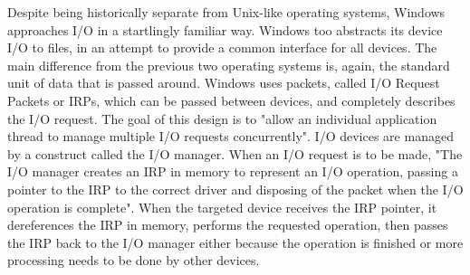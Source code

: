 \documentclass[10pt,draftclsnofoot,onecolumn]{IEEEtran}
\begin{document}
    \par
    Despite being historically separate from Unix-like operating systems, Windows approaches I/O in a startlingly familiar way. Windows too abstracts its device I/O to files, in an attempt to provide a common interface for all devices. The main difference from the previous two operating systems is, again, the standard unit of data that is passed around. Windows uses packets, called I/O Request Packets or IRPs, which can be passed between devices, and completely describes the I/O request. The goal of this design is to "allow an individual application thread to manage multiple I/O requests concurrently"\cite{russinovich_solomon_ionescu_2012}.
    I/O devices are managed by a construct called the I/O manager. When an I/O request is to be made, "The I/O manager creates an IRP in memory to represent an I/O operation, passing a pointer to the IRP to the correct driver and disposing of the packet when the I/O operation is complete"\cite{russinovich_solomon_ionescu_2012}. When the targeted device receives the IRP pointer, it dereferences the IRP in memory, performs the requested operation, then passes the IRP back to the I/O manager either because the operation is finished or more processing needs to be done by other devices.\newline
\end{document}
